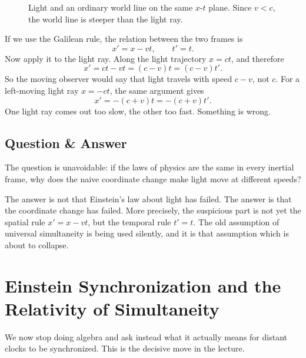 \begin{figure}
\centering
{}
\caption{Light and an ordinary world line on the same \(x\)-\(t\) plane. Since \(v<c\), the world line is steeper than the light ray.}
\end{figure}

If we use the Galilean rule, the relation between the two frames is
\begin{equation}
x'=x-vt,\qquad t'=t.
\end{equation}
Now apply it to the light ray. Along the light trajectory \(x=ct\), and therefore
\begin{equation}
x'=ct-vt=(c-v)t=(c-v)t'.
\end{equation}
So the moving observer would say that light travels with speed \(c-v\), not \(c\). For a left-moving light ray \(x=-ct\), the same argument gives
\begin{equation}
x'=-(c+v)t=-(c+v)t'.
\end{equation}
One light ray comes out too slow, the other too fast. Something is wrong.

\subsection{Question \& Answer}

The question is unavoidable: if the laws of physics are the same in every inertial frame, why does the naive coordinate change make light move at different speeds?

The answer is not that Einstein's law about light has failed. The answer is that the coordinate change has failed. More precisely, the suspicious part is not yet the spatial rule \(x'=x-vt\), but the temporal rule \(t'=t\). The old assumption of universal simultaneity is being used silently, and it is that assumption which is about to collapse.

\section{Einstein Synchronization and the Relativity of Simultaneity}

We now stop doing algebra and ask instead what it actually means for distant clocks to be synchronized. This is the decisive move in the lecture.

